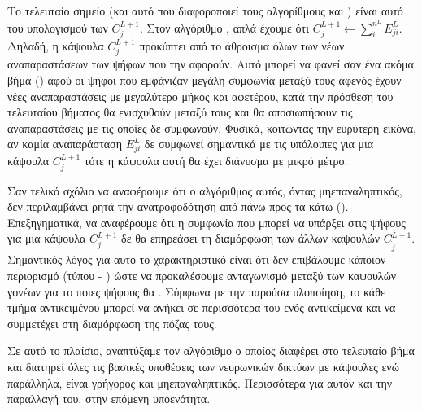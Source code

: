 Το τελευταίο σημείο (και αυτό που διαφοροποιεί τους αλγορίθμους  και ) είναι αυτό του υπολογισμού των $C_j^{L+1}$. Στον αλγόριθμο , απλά έχουμε ότι $C_j^{L+1} \gets \sum_i^{n^L} E^L_{ji}$. Δηλαδή, η κάψουλα $C_j^{L+1}$ προκύπτει από το άθροισμα όλων των νέων αναπαραστάσεων των ψήφων που την αφορούν. Αυτό μπορεί να φανεί σαν ένα ακόμα βήμα  () αφού οι ψήφοι που εμφάνιζαν μεγάλη συμφωνία μεταξύ τους αφενός έχουν νέες αναπαραστάσεις με μεγαλύτερο μήκος και αφετέρου, κατά την πρόσθεση του τελευταίου βήματος θα ενισχυθούν μεταξύ τους και θα αποσιωπήσουν τις αναπαραστάσεις με τις οποίες δε συμφωνούν. Φυσικά, κοιτώντας την ευρύτερη εικόνα, αν καμία αναπαράσταση $E^L_{ji}$ δε συμφωνεί σημαντικά με τις υπόλοιπες για μια κάψουλα $C_j^{L+1}$ τότε η κάψουλα αυτή θα έχει διάνυσμα με μικρό μέτρο.\par

Σαν τελικό σχόλιο να αναφέρουμε ότι ο αλγόριθμος αυτός, όντας μη\textendash επαναληπτικός, δεν περιλαμβάνει ρητά την ανατροφοδότηση από πάνω προς τα κάτω (). Επεξηγηματικά, να αναφέρουμε ότι η συμφωνία που μπορεί να υπάρξει στις ψήφους για μια κάψουλα $C_j^{L+1}$ δε θα επηρεάσει τη διαμόρφωση των άλλων καψουλών $C_{\grave{j}}^{L+1}$. Σημαντικός λόγος για αυτό το χαρακτηριστικό είναι ότι δεν επιβάλουμε κάποιον περιορισμό (τύπου  - ) ώστε να προκαλέσουμε ανταγωνισμό μεταξύ των καψουλών γονέων για το ποιες ψήφους θα . Σύμφωνα με την παρούσα υλοποίηση, το κάθε τμήμα αντικειμένου μπορεί να ανήκει σε περισσότερα του ενός αντικείμενα και να συμμετέχει στη διαμόρφωση της πόζας τους.\par

Σε αυτό το πλαίσιο, αναπτύξαμε τον αλγόριθμο  ο οποίος διαφέρει στο τελευταίο βήμα και διατηρεί όλες τις βασικές υποθέσεις των νευρωνικών δικτύων με κάψουλες ενώ παράλληλα, είναι γρήγορος και μη\textendash επαναληπτικός. Περισσότερα για αυτόν και την παραλλαγή του,  στην επόμενη υπο\textendash ενότητα.


